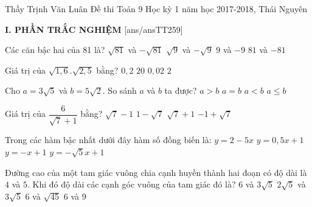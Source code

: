 
\begin{name}
{Thầy Trịnh Văn Luân}
{Đề thi Toán 9 Học kỳ 1 năm học 2017-2018, Thái Nguyên}
\end{name}
\noindent\textbf{I. PHẦN TRẮC NGHIỆM}
\setcounter{ex}{0}
[ans/ansTT259]
\begin{ex}%
	Các căn bậc hai của 81 là?
	\choice
	{$\sqrt{81}$ và $-\sqrt{81}$}
	{$\sqrt{9}$ và $-\sqrt{9}$}
	{\True $9$ và $-9$}
	{$81$ và $-81$}
	\loigiai{}
\end{ex}
\begin{ex}%
	Giá trị của $\sqrt{1,6}.\sqrt{2,5}$ bằng?
	\choice
	{$0,2$}
	{$20$}
	{$0,02$}
	{\True $2$}
\end{ex}
\begin{ex}%
	Cho $a= 3\sqrt{5}$ và $b= 5\sqrt{2}$. So sánh $a$ và $b$ ta được?
	\choice
	{$a > b$}
	{$a = b$}
	{\True $a < b$}
	{$a \leqslant b$}
\end{ex}
\begin{ex}%
	Giá trị của $\dfrac{6}{\sqrt{7}+ 1}$ bằng?
	\choice
	{\True $\sqrt{7}- 1$}
	{$1- \sqrt{7}$}
	{$\sqrt{7}+ 1$}
	{$-1+ \sqrt{7}$}
\end{ex}
\begin{ex}%
	Trong các hàm bậc nhất dưới đây hàm số đồng biến là:
	\choice
	{$y= 2- 5x$}
	{\True $y= 0,5x+ 1$}
	{$y= -x+ 1$}
	{$y= -\sqrt{5}x+ 1$}
\end{ex}
\begin{ex}%
	Đường cao của một tam giác vuông chia cạnh huyền thành hai đoạn có độ dài là $4$ và $5$. Khi đó độ dài các cạnh góc vuông của tam giác đó là?
	\choice
	{$6$ và $3\sqrt{5}$}
	{$2\sqrt{5}$ và $3\sqrt{5}$}
	{\True $6$ và $\sqrt{45}$}
	{$6$ và $9$}
\end{ex}
